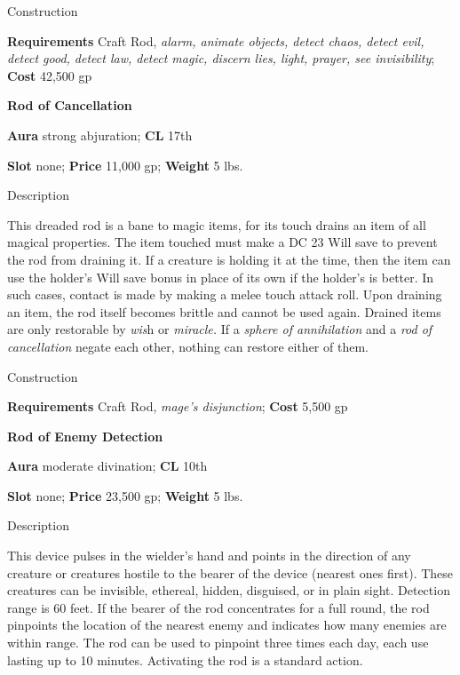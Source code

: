 Construction
				
\textbf{Requirements} Craft Rod, \textit{alarm, animate objects, detect chaos, detect evil, detect good, detect law, detect magic, discern lies, light, prayer, see invisibility}; \textbf{Cost }42,500 gp
				
\textbf{Rod of Cancellation}
				
\textbf{Aura} strong abjuration;\textbf{ CL }17th
				
\textbf{Slot} none; \textbf{Price} 11,000 gp; \textbf{Weight} 5 lbs.
				
Description
				
This dreaded rod is a bane to magic items, for its touch drains an item of all magical properties. The item touched must make a DC 23 Will save to prevent the rod from draining it. If a creature is holding it at the time, then the item can use the holder's Will save bonus in place of its own if the holder's is better. In such cases, contact 
is made
 by making a melee touch attack roll. Upon draining an item, the rod itself becomes brittle and 
cannot be used
 again. Drained items are only restorable by \textit{wis}h or \textit{miracle. }If a \textit{sphere of annihilation }and a \textit{rod of cancellation }negate each other, nothing can restore either of them.
				
Construction
				
\textbf{Requirements} Craft Rod, \textit{mage's disjunction}; \textbf{Cost }5,500 gp
				
\textbf{Rod of Enemy Detection}
				
\textbf{Aura} moderate divination;\textbf{ CL }10th
				
\textbf{Slot} none; \textbf{Price} 23,500 gp; \textbf{Weight} 5 lbs.
				
Description
				
This device pulses in the wielder's hand and points in the direction of any creature or creatures hostile to the bearer of the device (nearest ones first). These creatures can be invisible, ethereal, hidden, disguised, or in plain sight. Detection range is 60 feet. If the bearer of the rod concentrates for a full round, the rod pinpoints the location of the nearest enemy and indicates how many enemies are within range. The rod 
can be used
 to pinpoint three times each day, each use lasting up to 10 minutes. Activating the rod is a standard action. 
				
